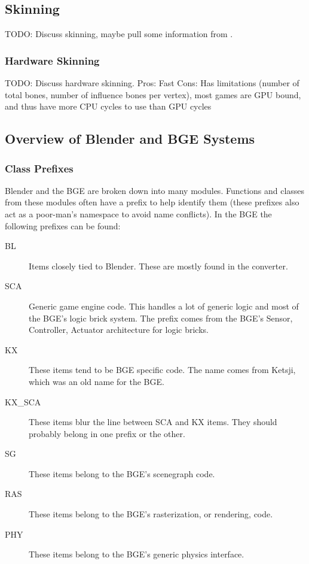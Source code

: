 \documentclass[10pt]{article}
\newcommand{\todo}[1] {{\color{todo} TODO: #1}}
\begin{document}
\subsection{Skinning}
\todo{Discuss skinning, maybe pull some information from \cite{Gregory2009}.}

\subsubsection{Hardware Skinning}
\todo{Discuss hardware skinning.}
Pros: Fast
Cons: Has limitations (number of total bones, number of influence bones per vertex), most games are GPU bound, and thus have more CPU cycles to use than GPU cycles

\subsection{Overview of Blender and BGE Systems}

\subsubsection{Class Prefixes}
Blender and the BGE are broken down into many modules. Functions and classes from these modules often have a prefix to help identify them (these prefixes also act as a poor-man's namespace to avoid name conflicts). In the BGE the following prefixes can be found:

\begin{description}
 \item[BL] Items closely tied to Blender. These are mostly found in the converter.
 \item[SCA] Generic game engine code. This handles a lot of generic logic and most of the BGE's logic brick system. The prefix comes from the BGE's Sensor, Controller, Actuator architecture for logic bricks.
 \item [KX] These items tend to be BGE specific code. The name comes from Ketsji, which was an old name for the BGE.
 \item [KX\_SCA] These items blur the line between SCA and KX items. They should probably belong in one prefix or the other.
 \item [SG] These items belong to the BGE's scenegraph code.
 \item [RAS] These items belong to the BGE's rasterization, or rendering, code.
 \item [PHY] These items belong to the BGE's generic physics interface.
\end{description}
\end{document}
